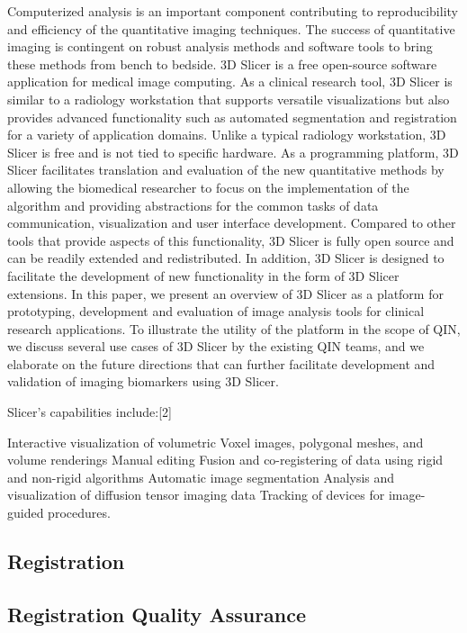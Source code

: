 \documentclass[type=dr, dr=rernat, accentcolor=tud7b,colorbacktitle, bigchapter, openright, twoside, 12pt ]{tudthesis}
\begin{document}
 Computerized analysis is an important component contributing to reproducibility and efficiency of the quantitative imaging techniques. 
 The success of quantitative imaging is contingent on robust analysis methods and software tools to bring these methods from bench to bedside. 
 3D Slicer is a free open-source software application for medical image computing. As a clinical research tool, 3D Slicer is similar to a radiology workstation that supports versatile visualizations but also provides advanced functionality such as automated segmentation and registration for a variety of application domains. Unlike a typical radiology workstation, 3D Slicer is free and is not tied to specific hardware. As a programming platform, 3D Slicer facilitates translation and evaluation of the new quantitative methods by allowing the biomedical researcher to focus on the implementation of the algorithm and providing abstractions for the common tasks of data communication, visualization and user interface development. Compared to other tools that provide aspects of this functionality, 3D Slicer is fully open source and can be readily extended and redistributed. In addition, 3D Slicer is designed to facilitate the development of new functionality in the form of 3D Slicer extensions. In this paper, we present an overview of 3D Slicer as a platform for prototyping, development and evaluation of image analysis tools for clinical research applications. To illustrate the utility of the platform in the scope of QIN, we discuss several use cases of 3D Slicer by the existing QIN teams, and we elaborate on the future directions that can further facilitate development and validation of imaging biomarkers using 3D Slicer.

Slicer's capabilities include:[2]

Interactive visualization of volumetric Voxel images, polygonal meshes, and volume renderings
Manual editing
Fusion and co-registering of data using rigid and non-rigid algorithms
Automatic image segmentation
Analysis and visualization of diffusion tensor imaging data
Tracking of devices for image-guided procedures.



\subsection{Registration}

\subsection{Registration Quality Assurance}
\end{document}
